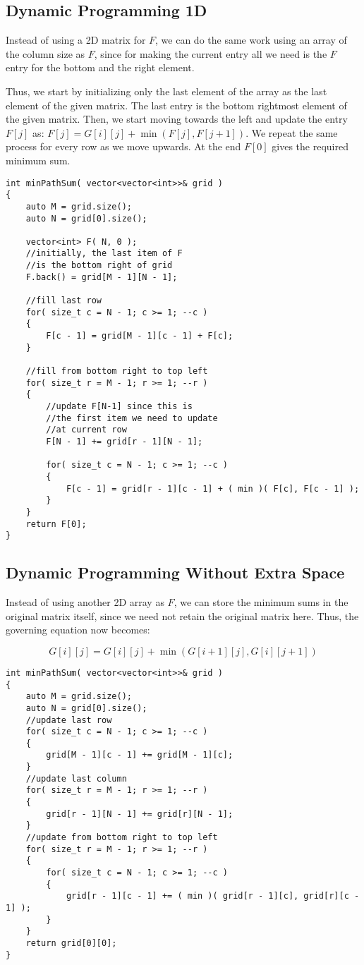 \subsection{Dynamic Programming 1D}
 Instead of using a 2D matrix for $F$, we can do the same work using an array of the column size as $F$, since for making the current entry all we need is the $F$ entry for the bottom and the right element. 

Thus, we start by initializing only the last element of the array as the last element of the given matrix. The last entry is the bottom rightmost element of the given matrix. Then, we start moving towards the left and update the entry $F[j]$ as: $F[j] = G[i][j] + \min(F[j], F[j+1])$. We repeat the same process for every row as we move upwards. At the end $F[0]$ gives the required minimum sum.

\begin{lstlisting}[style=customc, caption={1D DP}]
int minPathSum( vector<vector<int>>& grid )
{
    auto M = grid.size();
    auto N = grid[0].size();

    vector<int> F( N, 0 );
    //initially, the last item of F
    //is the bottom right of grid
    F.back() = grid[M - 1][N - 1];

    //fill last row
    for( size_t c = N - 1; c >= 1; --c )
    {
        F[c - 1] = grid[M - 1][c - 1] + F[c];
    }

    //fill from bottom right to top left
    for( size_t r = M - 1; r >= 1; --r )
    {
        //update F[N-1] since this is
        //the first item we need to update
        //at current row
        F[N - 1] += grid[r - 1][N - 1];

        for( size_t c = N - 1; c >= 1; --c )
        {
            F[c - 1] = grid[r - 1][c - 1] + ( min )( F[c], F[c - 1] );
        }
    }
    return F[0];
}
\end{lstlisting}

\subsection{Dynamic Programming Without Extra Space}
Instead of using another 2D array as $F$, we can store the minimum sums in the original matrix itself, since we need not retain the original matrix here. Thus, the governing equation now becomes:

\[
G[i][j] = G[i][j] + \min(G[i+1][j], G[i][j+1])
\]

\begin{lstlisting}[style=customc, caption={DP Without Extra Space}]
int minPathSum( vector<vector<int>>& grid )
{
    auto M = grid.size();
    auto N = grid[0].size();
    //update last row
    for( size_t c = N - 1; c >= 1; --c )
    {
        grid[M - 1][c - 1] += grid[M - 1][c];
    }
    //update last column
    for( size_t r = M - 1; r >= 1; --r )
    {
        grid[r - 1][N - 1] += grid[r][N - 1];
    }
    //update from bottom right to top left
    for( size_t r = M - 1; r >= 1; --r )
    {
        for( size_t c = N - 1; c >= 1; --c )
        {
            grid[r - 1][c - 1] += ( min )( grid[r - 1][c], grid[r][c - 1] );
        }
    }
    return grid[0][0];
}
\end{lstlisting}
